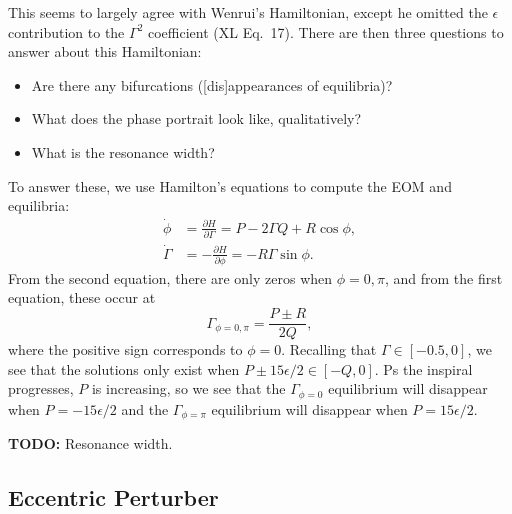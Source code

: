 \documentclass[10pt,
        usenames, %
        dvipsnames %
    ]{article}
\newcommand*{\pd}[2]{\frac{\partial#1}{\partial#2}}
\begin{document}
This seems to largely agree with Wenrui's Hamiltonian, except he omitted the
$\epsilon$ contribution to the $\Gamma^2$ coefficient (XL Eq.~17). There are
then three questions to answer about this Hamiltonian:
\begin{itemize}
    \item Are there any bifurcations ([dis]appearances of equilibria)?
    \item What does the phase portrait look like, qualitatively?
    \item What is the resonance width?
\end{itemize}

To answer these, we use Hamilton's equations to compute the EOM and equilibria:
\begin{align}
    \dot{\phi} &= \pd{H}{\Gamma} = P - 2\Gamma Q + R \cos \phi,\\
    \dot{\Gamma} &= -\pd{H}{\phi} = -R\Gamma \sin \phi.
\end{align}
From the second equation, there are only zeros when $\phi = 0, \pi$, and from
the first equation, these occur at
\begin{equation}
    \Gamma_{\phi = 0, \pi} = \frac{P \pm R}{2Q},
\end{equation}
where the positive sign corresponds to $\phi = 0$. Recalling that $\Gamma \in
[-0.5, 0]$, we see that the solutions only exist when $P \pm 15\epsilon/2 \in
[-Q, 0]$. Ps the inspiral progresses, $P$ is increasing, so we see that the
$\Gamma_{\phi = 0}$ equilibrium will disappear when $P = -15\epsilon/2$ and the
$\Gamma_{\phi = \pi}$ equilibrium will disappear when $P = 15\epsilon/2$.

\textbf{TODO:} Resonance width.

\subsection{Eccentric Perturber}
\end{document}
